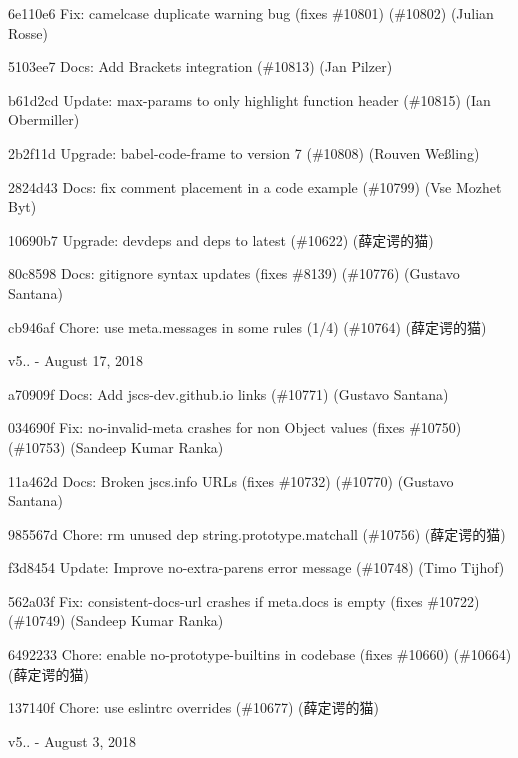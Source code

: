 \begin{DoxyItemize}
\item 6e110e6 Fix\+: camelcase duplicate warning bug (fixes \#10801) (\#10802) (Julian Rosse)
\item 5103ee7 Docs\+: Add Brackets integration (\#10813) (Jan Pilzer)
\item b61d2cd Update\+: max-\/params to only highlight function header (\#10815) (Ian Obermiller)
\item 2b2f11d Upgrade\+: babel-\/code-\/frame to version 7 (\#10808) (Rouven Weßling)
\item 2824d43 Docs\+: fix comment placement in a code example (\#10799) (Vse Mozhet Byt)
\item 10690b7 Upgrade\+: devdeps and deps to latest (\#10622) (薛定谔的猫)
\item 80c8598 Docs\+: gitignore syntax updates (fixes \#8139) (\#10776) (Gustavo Santana)
\item cb946af Chore\+: use meta.\+messages in some rules (1/4) (\#10764) (薛定谔的猫)
\end{DoxyItemize}

v5.. -\/ August 17, 2018


\begin{DoxyItemize}
\item a70909f Docs\+: Add jscs-\/dev.\+github.\+io links (\#10771) (Gustavo Santana)
\item 034690f Fix\+: no-\/invalid-\/meta crashes for non Object values (fixes \#10750) (\#10753) (Sandeep Kumar Ranka)
\item 11a462d Docs\+: Broken jscs.\+info U\+R\+Ls (fixes \#10732) (\#10770) (Gustavo Santana)
\item 985567d Chore\+: rm unused dep string.\+prototype.\+matchall (\#10756) (薛定谔的猫)
\item f3d8454 Update\+: Improve no-\/extra-\/parens error message (\#10748) (Timo Tijhof)
\item 562a03f Fix\+: consistent-\/docs-\/url crashes if meta.\+docs is empty (fixes \#10722) (\#10749) (Sandeep Kumar Ranka)
\item 6492233 Chore\+: enable no-\/prototype-\/builtins in codebase (fixes \#10660) (\#10664) (薛定谔的猫)
\item 137140f Chore\+: use eslintrc overrides (\#10677) (薛定谔的猫)
\end{DoxyItemize}

v5.. -\/ August 3, 2018


